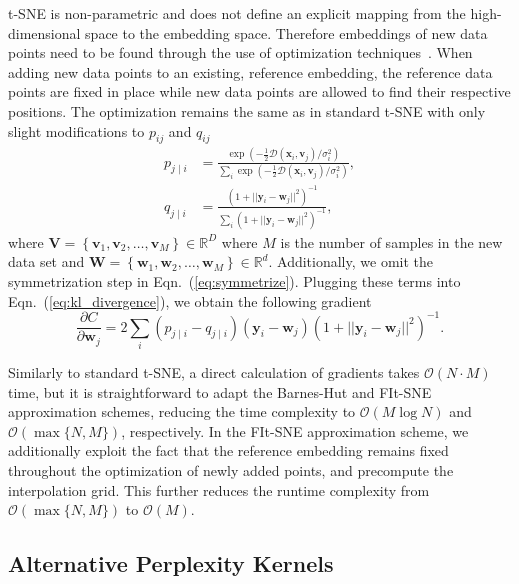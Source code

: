 \documentclass[twocolumn]{article}
\begin{document}
t-SNE is non-parametric and does not define an explicit mapping from the
high-dimensional space to the embedding space. Therefore embeddings of new data
points need to be found through the use of optimization
techniques~\cite{policar2019embedding}. When adding new data points to an
existing, reference embedding, the reference data points are fixed in place
while new data points are allowed to find their respective positions. The
optimization remains the same as in standard t-SNE with only slight
modifications to $p_{ij}$ and $q_{ij}$
\begin{align}
p_{j \mid i} &= \frac{\exp \left ( -\frac{1}{2} \mathcal{D}(\mathbf{x}_i, \mathbf{v}_j) /  \sigma_i^2 \right )}{\sum_{i} \exp \left ( -\frac{1}{2} \mathcal{D}(\mathbf{x}_i, \mathbf{v}_j) / \sigma_i^2 \right )}, \\
q_{j \mid i} &= \frac{\left ( 1 + || \mathbf{y}_i - \mathbf{w}_j ||^2 \right )^{-1}}{\sum_{i}\left ( 1 + || \mathbf{y}_i - \mathbf{w}_j ||^2 \right )^{-1}},
\end{align}
\noindent where $\mathbf{V} = \left \{ \mathbf{v}_1, \mathbf{v}_2, \dots,
\mathbf{v}_M \right \} \in \mathbb{R}^D$ where $M$ is the number of samples in
the new data set and $\mathbf{W} = \left \{ \mathbf{w}_1, \mathbf{w}_2, \dots,
\mathbf{w}_M \right \} \in \mathbb{R}^d$. Additionally, we omit the
symmetrization step in Eqn.~(\ref{eq:symmetrize}). Plugging these terms into
Eqn.~(\ref{eq:kl_divergence}), we obtain the following gradient
\begin{equation}
\frac{\partial C}{\partial \mathbf{w}_j} = 2 \sum_i \left ( p_{j \mid i} - q_{j \mid i} \right ) \left ( \mathbf{y}_i - \mathbf{w}_j \right ) \left ( 1 + || \mathbf{y}_i - \mathbf{w}_j || ^2 \right )^{-1}.
\label{eq:gradient}
\end{equation}

Similarly to standard t-SNE, a direct calculation of gradients takes
$\mathcal{O}(N \cdot M)$ time, but it is straightforward to adapt the Barnes-Hut
and FIt-SNE approximation schemes, reducing the time complexity to
$\mathcal{O}(M \log N)$ and $\mathcal{O}(\max \{ N, M \})$, respectively. In the
FIt-SNE approximation scheme, we additionally exploit the fact that the
reference embedding remains fixed throughout the optimization of newly added
points, and precompute the interpolation grid. This further reduces the runtime
complexity from $\mathcal{O}(\max \{ N, M \})$ to $\mathcal{O}(M)$.

\subsection*{Alternative Perplexity Kernels}
\end{document}
